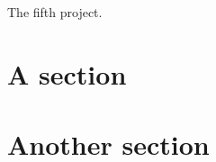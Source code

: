 The fifth project.

\lipsum[1]

\section{A section}
\lipsum[2]

\section{Another section}
\lipsum[3]